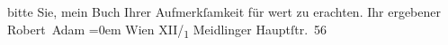 \begin{ledgroupsized}[t]{13cm}
                    bitte Sie, mein Buch Ihrer Aufmerkſamkeit für wert zu erachten.\pend
           \pstart
           Ihr ergebener{\\[\baselineskip]}\spacefill\mbox{Robert Adam}\pend
           \leftskip=0em{}\pstart
           \noindent{}Wien XII/\textsubscript{1} Meidlinger
                            Hauptſtr. 56\pend
           \endnumbering{}\end{ledgroupsized}  \newcommand{\dateiname}{L01830}\newcommand{\titel}{Robert Adam an Arthur Schnitzler, 25. 2. 1909}\newcommand{\editorInnen}{Martin Anton Müller und Gerd-Hermann Susen}
      